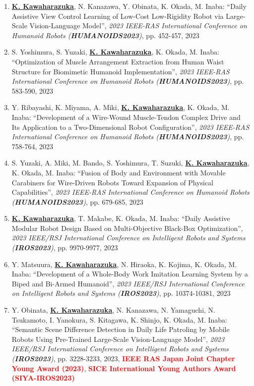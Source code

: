 \documentclass[letterpaper]{article}
\begin{document}
\begin{enumerate}
\item \underline{\textbf{K. Kawaharazuka}}, N. Kanazawa, Y. Obinata, K. Okada, M. Inaba: ``Daily Assistive View Control Learning of Low-Cost Low-Rigidity Robot via Large-Scale Vision-Language Model'', \textit{2023 IEEE-RAS International Conference on Humanoid Robots (\textit{\textbf{HUMANOIDS2023}})}, pp. 452-457, 2023
\item S. Yoshimura, S. Yuzaki, \underline{\textbf{K. Kawaharazuka}}, K. Okada, M. Inaba: ``Optimization of Muscle Arrangement Extraction from Human Waist Structure for Biomimetic Humanoid Implementation'', \textit{2023 IEEE-RAS International Conference on Humanoid Robots (\textit{\textbf{HUMANOIDS2023}})}, pp. 583-590, 2023
\item Y. Ribayashi, K. Miyama, A. Miki, \underline{\textbf{K. Kawaharazuka}}, K. Okada, M. Inaba: ``Development of a Wire-Wound Muscle-Tendon Complex Drive and Its Application to a Two-Dimensional Robot Configuration'', \textit{2023 IEEE-RAS International Conference on Humanoid Robots (\textit{\textbf{HUMANOIDS2023}})}, pp. 758-764, 2023
\item S. Yuzaki, A. Miki, M. Bando, S. Yoshimura, T. Suzuki, \underline{\textbf{K. Kawaharazuka}}, K. Okada, M. Inaba: ``Fusion of Body and Environment with Movable Carabiners for Wire-Driven Robots Toward Expansion of Physical Capabilities'', \textit{2023 IEEE-RAS International Conference on Humanoid Robots (\textit{\textbf{HUMANOIDS2023}})}, pp. 679-685, 2023
\item \underline{\textbf{K. Kawaharazuka}}, T. Makabe, K. Okada, M. Inaba: ``Daily Assistive Modular Robot Design Based on Multi-Objective Black-Box Optimization'', \textit{2023 IEEE/RSJ International Conference on Intelligent Robots and Systems (\textit{\textbf{IROS2023}})}, pp. 9970-9977, 2023
\item Y. Matsuura, \underline{\textbf{K. Kawaharazuka}}, N. Hiraoka, K. Kojima, K. Okada, M. Inaba: ``Development of a Whole-Body Work Imitation Learning System by a Biped and Bi-Armed Humanoid'', \textit{2023 IEEE/RSJ International Conference on Intelligent Robots and Systems (\textit{\textbf{IROS2023}})}, pp. 10374-10381, 2023
\item Y. Obinata, \underline{\textbf{K. Kawaharazuka}}, N. Kanazawa, N. Yamaguchi, N. Tsukamoto, I. Yanokura, S. Kitagawa, K. Shinjo, K. Okada, M. Inaba: ``Semantic Scene Difference Detection in Daily Life Patroling by Mobile Robots Using Pre-Trained Large-Scale Vision-Language Model'', \textit{2023 IEEE/RSJ International Conference on Intelligent Robots and Systems (\textit{\textbf{IROS2023}})}, pp. 3228-3233, 2023, \textbf{\textcolor{red}{IEEE RAS Japan Joint Chapter Young Award (2023)}}, \textbf{\textcolor{red}{SICE International Young Authors Award (SIYA-IROS2023)}}

\end{enumerate}
\end{document}
